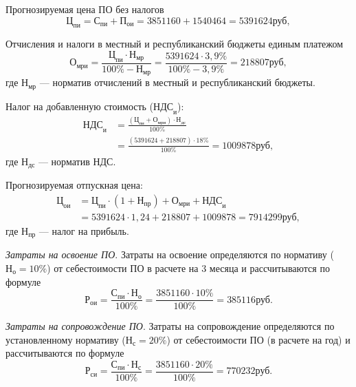 Прогнозируемая цена ПО без налогов
\begin{displaymath}
  \text{Ц}_{\text{пи}} = \text{С}_{\text{пи}} + \text{П}_{\text{ои}} = 3851160 + 1540464 = 5391624 \text{руб},
\end{displaymath}

Отчисления и налоги в местный и республиканский бюджеты единым платежом
\begin{displaymath}
  \text{О}_{\text{мри}} = \frac{\text{Ц}_{\text{пи}} \cdot \text{Н}_{\text{мр}}}{100\% - \text{Н}_{\text{мр}}} = \frac{5391624 \cdot 3,9\%}{100\% - 3,9\%} = 218807 \text{руб},
\end{displaymath}
где \( \text{Н}_{\text{мр}} \) --- норматив отчислений в местный и республиканский бюджеты.

Налог на добавленную стоимость (\( \text{НДС}_{\text{и}} \)):
\begin{align*}
  \text{НДС}_{\text{и}} &= \frac{(\text{Ц}_{\text{пи}} + \text{О}_{\text{мри}}) \cdot \text{Н}_{\text{дс}}}{100\%}\\
  &= \frac{(5391624 + 218807) \cdot 18\%}{100\%} = 1009878 \text{руб},
\end{align*}
где \( \text{Н}_{\text{дс}} \) --- норматив НДС.

Прогнозируемая отпускная цена:
\begin{align*}
  \text{Ц}_{\text{ои}} &= \text{Ц}_{\text{пи}} \cdot (1 + \text{Н}_{\text{пр}}) + \text{О}_{\text{мри}} + \text{НДС}_{\text{и}}\\
  &= 5391624 \cdot 1,24 + 218807 + 1009878 = 7914299 \text{руб},
\end{align*}
где \( \text{Н}_{\text{пр}} \) --- налог на прибыль.

\emph{Затраты на освоение ПО}. Затраты на освоение определяются по нормативу (\( \text{Н}_{\text{о}} = 10\% \)) от себестоимости ПО в расчете на 3 месяца и рассчитываются по формуле
\begin{displaymath}
  \text{Р}_{\text{ои}} = \frac{\text{С}_{\text{пи}} \cdot \text{Н}_{\text{о}}}{100\%} = \frac{3851160 \cdot 10\%}{100\%} = 385116 \text{руб}.
\end{displaymath}

\emph{Затраты на сопровождение ПО}. Затраты на сопровождение определяются по установленному нормативу (\( \text{Н}_{\text{с}} = 20\% \)) от себестоимости ПО (в расчете на год) и рассчитываются по формуле
\begin{displaymath}
  \text{Р}_{\text{си}} = \frac{\text{С}_{\text{пи}} \cdot \text{Н}_{\text{с}}}{100\%} = \frac{3851160 \cdot 20\%}{100\%} = 770232 \text{руб}.
\end{displaymath}

